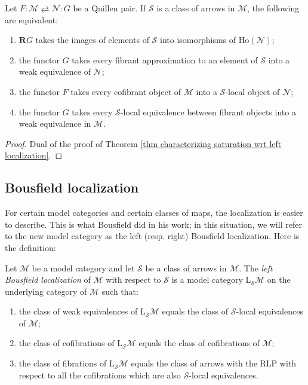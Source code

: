 \begin{refsection}
\begin{thm} \label{thm characterizing saturation wrt right localization}
Let $F \colon \mathcal M \rightleftarrows \mathcal N \colon G$ be a Quillen pair. If $\mathcal S$ is a class of arrows in $\mathcal M$, the following are equivalent:
\begin{enumerate}
\item $\mathbf R G$ takes the images of elements of $\mathcal S$ into isomorphisms of $\mathrm{Ho}(\mathcal N)$;
\item the functor $G$ takes every fibrant approximation to an element of $\mathcal S$ into a weak equivalence of $\mathcal N$;
\item the functor $F$ takes every cofibrant object of $\mathcal M$ into a $\mathcal S$-local object of $\mathcal N$;
\item the functor $G$ takes every $\mathcal S$-local equivalence between fibrant objects into a weak equivalence in $\mathcal M$.
\end{enumerate}
\end{thm}

\begin{proof}
Dual of the proof of Theorem \ref{thm characterizing saturation wrt left localization}.
\end{proof}

\subsection{Bousfield localization}

For certain model categories and certain classes of maps, the localization is easier to describe. This is what Bousfield did in his work; in this situation, we will refer to the new model category as the left (resp. right) Bousfield localization. Here is the definition:

\begin{defin}
Let $\mathcal M$ be a model category and let $\mathcal S$ be a class of arrows in $\mathcal M$. The \emph{left Bousfield localization} of $\mathcal M$ with respect to $\mathcal S$ is a model category $\mathrm L_{\mathcal S}\mathcal M$ on the underlying category of $\mathcal M$ such that:
\begin{enumerate}
\item the class of weak equivalences of $\mathrm L_{\mathcal S} \mathcal M$ equals the class of $\mathcal S$-local equivalences of $\mathcal M$;
\item the class of cofibrations of $\mathrm L_{\mathcal S} \mathcal M$ equals the class of cofibrations of $\mathcal M$;
\item the class of fibrations of $\mathrm L_{\mathcal S} \mathcal M$ equals the class of arrows with the RLP with respect to all the cofibrations which are also $\mathcal S$-local equivalences.
\end{enumerate}
\end{defin}


\end{refsection}
